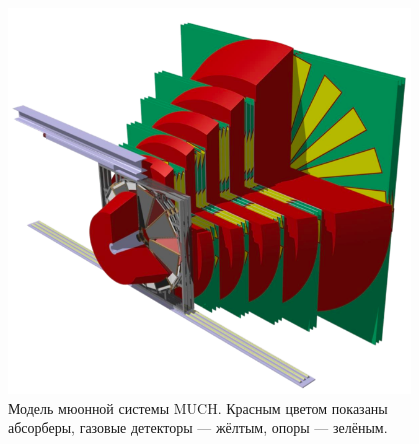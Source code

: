 \begin{minipage}[b]{0.495\textwidth}
\begin{figure}[H]
\centering
\includegraphics[width=0.95\textwidth]{pictures/CBM_MUCH_model.png}
\caption{Модель мюонной системы MUCH. Красным цветом показаны абсорберы, газовые детекторы --- жёлтым, опоры --- зелёным.}
\label{fig:MUCH2}
\end{figure}
\end{minipage}



